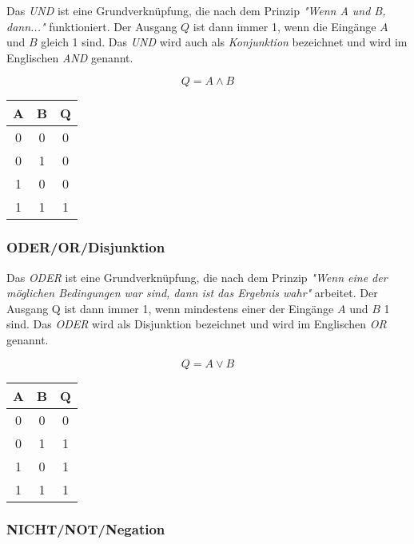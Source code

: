 \documentclass[a4paper, 12pt]{report}
\begin{document}
Das \emph{UND} ist eine Grundverknüpfung, die nach dem Prinzip
\emph{"Wenn A und B, dann..."} funktioniert. Der Ausgang $Q$ ist dann immer 1,
wenn die Eingänge $A$ und $B$ gleich 1 sind. Das \emph{UND} wird auch als
\emph{Konjunktion} bezeichnet und wird im Englischen \emph{AND} genannt.

\begin{center}
    \begin{equation}
	Q = A \land B
    \end{equation}
    \begin{tabular}{ | c | c || c | }
    	\hline
    	A & B & Q \\ \hline
    	0 & 0 & 0 \\ \hline
    	0 & 1 & 0 \\ \hline
    	1 & 0 & 0 \\ \hline
    	1 & 1 & 1 \\
    	\hline
    \end{tabular}
\end{center}

\subsubsection{ODER/OR/Disjunktion}

Das \emph{ODER} ist eine Grundverknüpfung, die nach dem Prinzip
\emph{"Wenn eine der möglichen Bedingungen war sind, dann ist das Ergebnis
wahr"} arbeitet. Der Ausgang Q ist dann immer 1, wenn mindestens einer der
Eingänge $A$ und $B$ 1 sind. Das \emph{ODER} wird als Disjunktion bezeichnet
und wird im Englischen \emph{OR} genannt.

\begin{center}
    \begin{equation}
	Q = A \lor B
    \end{equation}
   \begin{tabular}{ | c | c || c | }
    	\hline
    	A & B & Q \\ \hline
    	0 & 0 & 0 \\ \hline
    	0 & 1 & 1 \\ \hline
    	1 & 0 & 1 \\ \hline
    	1 & 1 & 1 \\
    	\hline
    \end{tabular}
\end{center}

\subsubsection{NICHT/NOT/Negation}
\end{document}
